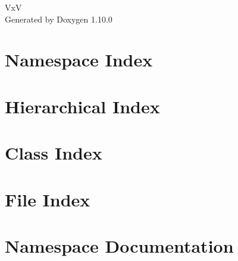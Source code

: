 \documentclass[twoside]{book}
\newcommand{\+}{\discretionary{\mbox{\scriptsize$\hookleftarrow$}}{}{}}
\newcommand{\clearemptydoublepage}{%
    \newpage{\pagestyle{empty}\cleardoublepage}%
  }
\begin{document}
  \raggedbottom
    \hypersetup{pageanchor=false,
                bookmarksnumbered=true,
                pdfencoding=unicode
               }
  \begin{titlepage}
  \vspace*{7cm}
  \begin{center}%
  {\Large VxV}\\
  \vspace*{1cm}
  {\large Generated by Doxygen 1.10.0}\\
  \end{center}
  \end{titlepage}
  \clearemptydoublepage
  \tableofcontents
  \clearemptydoublepage
  \hypersetup{pageanchor=true}
\chapter{Namespace Index}

\chapter{Hierarchical Index}

\chapter{Class Index}

\chapter{File Index}

\chapter{Namespace Documentation}


\end{document}
